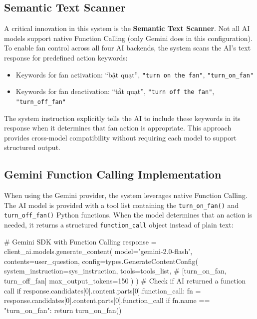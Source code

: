 \documentclass[12pt,a4paper]{report}
\begin{document}
\subsection{Semantic Text Scanner}
A critical innovation in this system is the \textbf{Semantic Text Scanner}. Not all AI models support native Function Calling (only Gemini does in this configuration). To enable fan control across all four AI backends, the system scans the AI's text response for predefined action keywords:

\begin{itemize}
    \item Keywords for fan activation: \foreignlanguage{vietnamese}{``bật quạt''}, \texttt{"turn on the fan"}, \texttt{"turn\_on\_fan"}
    \item Keywords for fan deactivation: \foreignlanguage{vietnamese}{``tắt quạt''}, \texttt{"turn off the fan"}, \texttt{"turn\_off\_fan"}
\end{itemize}

The system instruction explicitly tells the AI to include these keywords in its response when it determines that fan action is appropriate. This approach provides cross-model compatibility without requiring each model to support structured output.

\subsection{Gemini Function Calling Implementation}
When using the Gemini provider, the system leverages native Function Calling. The AI model is provided with a tool list containing the \texttt{turn\_on\_fan()} and \texttt{turn\_off\_fan()} Python functions. When the model determines that an action is needed, it returns a structured \texttt{function\_call} object instead of plain text:

\begin{codebox}[Python]
# Gemini SDK with Function Calling
response = client_ai.models.generate_content(
    model='gemini-2.0-flash',
    contents=user_question,
    config=types.GenerateContentConfig(
        system_instruction=sys_instruction,
        tools=tools_list,  # [turn_on_fan, turn_off_fan]
        max_output_tokens=150
    )
)
# Check if AI returned a function call
if response.candidates[0].content.parts[0].function_call:
    fn = response.candidates[0].content.parts[0].function_call
    if fn.name == "turn_on_fan":
        return turn_on_fan()
\end{codebox}
\end{document}

